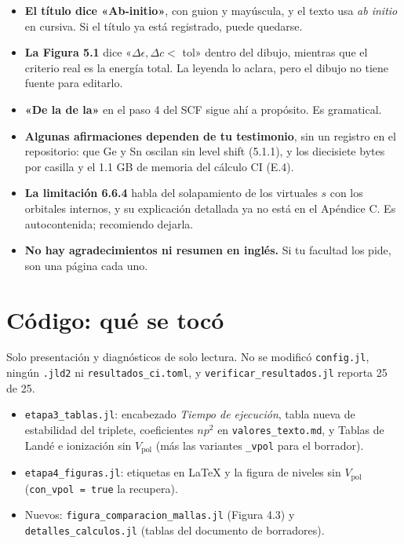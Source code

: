 \documentclass[11pt,a4paper]{article}
\newcommand{\arch}[1]{\texttt{\small #1}}
\begin{document}
\begin{itemize}
\item \textbf{El título dice «Ab-initio»}, con guion y mayúscula, y el texto usa \emph{ab initio} en
cursiva. Si el título ya está registrado, puede quedarse.
\item \textbf{La Figura 5.1} dice «$\Delta\epsilon, \Delta c <$ tol» dentro del dibujo, mientras que el
criterio real es la energía total. La leyenda lo aclara, pero el dibujo no tiene fuente para editarlo.
\item \textbf{«De la de la»} en el paso 4 del SCF sigue ahí a propósito. Es gramatical.
\item \textbf{Algunas afirmaciones dependen de tu testimonio}, sin un registro en el repositorio: que Ge
y Sn oscilan sin level shift (5.1.1), y los diecisiete bytes por casilla y el 1.1 GB de memoria del
cálculo CI (E.4).
\item \textbf{La limitación 6.6.4} habla del solapamiento de los virtuales $s$ con los orbitales
internos, y su explicación detallada ya no está en el Apéndice C. Es autocontenida; recomiendo dejarla.
\item \textbf{No hay agradecimientos ni resumen en inglés.} Si tu facultad los pide, son una página cada uno.
\end{itemize}

\section{Código: qué se tocó}

Solo presentación y diagnósticos de solo lectura. No se modificó \arch{config.jl}, ningún
\arch{.jld2} ni \arch{resultados\_ci.toml}, y \arch{verificar\_resultados.jl} reporta 25 de 25.

\begin{itemize}
\item \arch{etapa3\_tablas.jl}: encabezado \emph{Tiempo de ejecución}, tabla nueva de estabilidad del
triplete, coeficientes $np^2$ en \arch{valores\_texto.md}, y Tablas de Landé e ionización sin
$V_{\text{pol}}$ (más las variantes \arch{\_vpol} para el borrador).
\item \arch{etapa4\_figuras.jl}: etiquetas en LaTeX y la figura de niveles sin $V_{\text{pol}}$
(\arch{con\_vpol = true} la recupera).
\item Nuevos: \arch{figura\_comparacion\_mallas.jl} (Figura 4.3) y \arch{detalles\_calculos.jl}
(tablas del documento de borradores).
\end{itemize}
\end{document}
